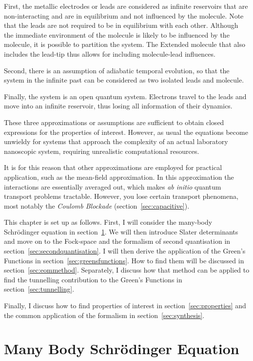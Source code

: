 First, the metallic electrodes or leads are considered as infinite reservoirs that are non-interacting and are in equilibrium and not influenced by the molecule. Note that the leads are not required to be in equilibrium with each other. Although the immediate environment of the molecule is likely to be influenced by the molecule, it is possible to partition the system. The Extended molecule that also includes the lead-tip thus allows for including  molecule-lead influences.

Second, there is an assumption of adiabatic temporal evolution, so that the system in the infinite past can be considered as two isolated leads and molecule.  

Finally, the system is an open quantum system. Electrons travel to the leads and move into an infinite reservoir, thus losing all information of their dynamics. 

These three approximations or assumptions are sufficient to obtain closed expressions for the properties of interest. However, as usual the equations become unwieldy for systems that approach the complexity of an actual laboratory nanoscopic system, requiring unrealistic computational resources.

It is for this reason that other approximations are employed for practical application, such as the mean-field approximation. In this approximation the interactions are essentially averaged out, which makes \emph{ab initio} quantum transport problems tractable. However, you lose certain transport phenomena, most notably the \emph{Coulomb Blockade} (section~\ref{sec:capacitive}).

This chapter is set up as follows. First, I will consider the many-body Schr\"odinger equation in section~\ref{sec:schrodinger}. We will then introduce Slater determinants and move on to the Fock-space and the formalism of second quantisation in section~\ref{sec:secondquantisation}. I will then derive the application of the Green's Functions in section~\ref{sec:greensfunctions}. How to find them will be discussed in section~\ref{sec:eommethod}. Separately, I discuss how that method can be applied to find the tunnelling contribution to the Green's Functions in section~\ref{sec:tunnelling}.

Finally, I discuss how to find properties of interest in section~\ref{sec:properties} and the common application of the formalism in section~\ref{sec:synthesis}.

\section{Many Body Schr\"odinger Equation}
\label{sec:schrodinger}

